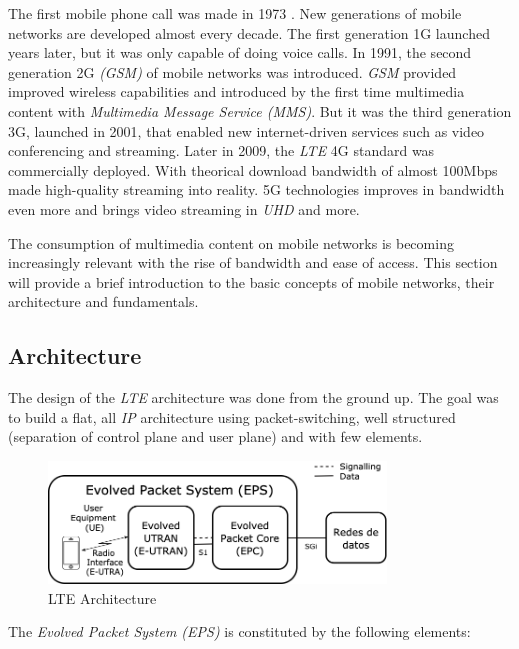 The first mobile phone call was made in 1973 \cite{mob1}. New generations of mobile networks 
are developed almost every decade. The first generation 1G launched years later, but
it was only capable of doing voice calls. In 1991, the second generation 2G \textit{(GSM)} of 
mobile networks was introduced. \textit{GSM} provided improved wireless capabilities and 
introduced by the first time multimedia content with \textit{Multimedia Message Service (MMS)}.
But it was the third generation 3G, launched in 2001, that enabled new internet-driven
services such as video conferencing and streaming. Later in 2009, the \textit{LTE} 4G standard
was commercially deployed. With theorical download bandwidth of almost 100Mbps made high-quality
streaming into reality. 5G technologies improves in bandwidth even more and brings 
video streaming in \textit{UHD} and more.

The consumption of multimedia content on mobile networks is becoming increasingly relevant with 
the rise of bandwidth and ease of access. This section will provide a brief introduction to the 
basic concepts of mobile networks, their architecture and fundamentals.

\subsection{Architecture}
\label{sec:eps}

The design of the \textit{LTE} architecture was done from the ground up. The goal was to build a flat, all
\textit{IP} architecture using packet-switching, well structured (separation of control plane and user plane)
and with few elements.

\begin{figure}[h]
  \centering
  \includegraphics[width=0.8\textwidth]{img/eps.png}
  \caption{LTE Architecture}
  \label{fig:eps}
\end{figure}

The \textit{Evolved Packet System (EPS)} is constituted by the following elements:


